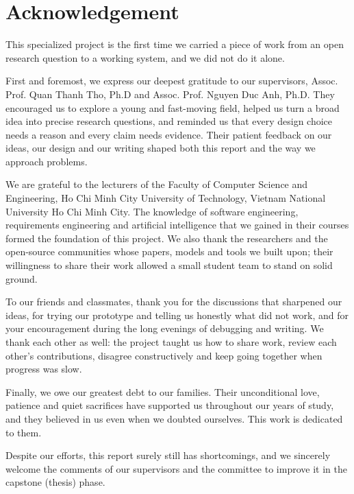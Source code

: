 \section*{\Huge Acknowledgement}

This specialized project is the first time we carried a piece of work from an open research question to a working system, and we did not do it alone.

First and foremost, we express our deepest gratitude to our supervisors, Assoc. Prof. Quan Thanh Tho, Ph.D and Assoc. Prof. Nguyen Duc Anh, Ph.D. They encouraged us to explore a young and fast-moving field, helped us turn a broad idea into precise research questions, and reminded us that every design choice needs a reason and every claim needs evidence. Their patient feedback on our ideas, our design and our writing shaped both this report and the way we approach problems.

We are grateful to the lecturers of the Faculty of Computer Science and Engineering, Ho Chi Minh City University of Technology, Vietnam National University Ho Chi Minh City. The knowledge of software engineering, requirements engineering and artificial intelligence that we gained in their courses formed the foundation of this project. We also thank the researchers and the open-source communities whose papers, models and tools we built upon; their willingness to share their work allowed a small student team to stand on solid ground.

To our friends and classmates, thank you for the discussions that sharpened our ideas, for trying our prototype and telling us honestly what did not work, and for your encouragement during the long evenings of debugging and writing. We thank each other as well: the project taught us how to share work, review each other's contributions, disagree constructively and keep going together when progress was slow.

Finally, we owe our greatest debt to our families. Their unconditional love, patience and quiet sacrifices have supported us throughout our years of study, and they believed in us even when we doubted ourselves. This work is dedicated to them.

Despite our efforts, this report surely still has shortcomings, and we sincerely welcome the comments of our supervisors and the committee to improve it in the capstone (thesis) phase.
